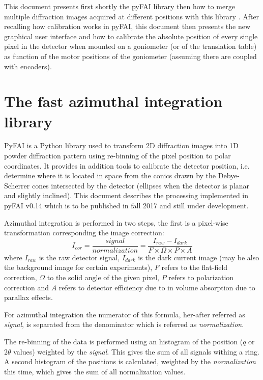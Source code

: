 \documentclass[preprint]{iucr}              %
\begin{document}
This document presents first shortly the pyFAI library \cite{fv5028} then how to
merge multiple diffraction images acquired at different positions with this
library \cite{PyFAI_PDJ}. 
After recalling how calibration works in pyFAI, this document then 
presents the new graphical user interface and how to
calibrate the absolute position of every single pixel in the detector when
mounted on a goniometer (or of the translation table) as function of the  motor
positions of the goniometer (assuming there are coupled with encoders). 

\section{The fast azimuthal integration library}

PyFAI is a Python \cite{python} library used to transform 2D diffraction images into
1D powder diffraction pattern using re-binning of the pixel position to polar coordinates.
It provides in addition tools to calibrate the detector position, i.e. determine
where it is located in space from the conics drawn by the Debye-Scherrer cones
intersected by the detector (ellipses when the detector is planar and slightly
inclined). This document describes the processing implemented in pyFAI
v0.14 which is to be published in fall 2017 and still under development.

Azimuthal integration is performed in two steps, the first is a pixel-wise
transformation corresponding the image correction:
$$
I_{cor} = \frac{signal}{normalization}  = \frac{I_{raw} - I_{dark}}{F \times
\Omega \times P \times A } $$
where $I_{raw}$ is the raw detector signal, $I_{dark}$ is the dark current
image (may be also the background image for certain experiments), $F$ refers to
the flat-field correction, $\Omega$ to the solid angle of the given pixel, $P$
refers to polarization correction and $A$ refers to detector efficiency due
to in volume absorption due to parallax effects.

For azimuthal integration the numerator of this formula, her-after referred as
\textit{signal}, is separated from the denominator which is referred as
\textit{normalization}.

The re-binning of the data is performed using an histogram of the position ($q$
or $2\theta$ values) weighted by the \textit{signal}.
This gives the sum of all signals withing a ring.
A second histogram of the positions is calculated, weighted by the
\textit{normalization} this time, which gives the sum of all normalization
values.
\end{document}
